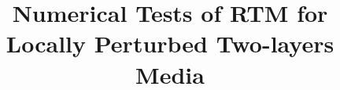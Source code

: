 \documentclass[12pt]{iopart}
\begin{document}

\def\debproof{\noindent {\bf Proof.} }
\def\finproof{\hfill {\small $\Box$} \\}
\makeatletter %
\makeatother  %
\renewcommand\theequation{{\thesection}.{\arabic{equation}}}

\title[]{Numerical Tests of RTM for Locally Perturbed Two-layers Media}
\author{ }
\address{}



\maketitle

\newcommand{\eps}{\varepsilon}
\newcommand{\RR}{\mathcal{R}}
\newtheorem{lem}{Lemma}[section]
\newtheorem{prop}{Proposition}[section]
\newtheorem{cor}{Corollary}[section]
\newtheorem{thm}{Theorem}[section]
\newtheorem{rem}{Remark}[section]
\newtheorem{alg}{Algorithm}[section]
\newtheorem{assum}{Assumption}[section]
\newtheorem{definition}{Definition}[section]


\newcommand{\MyRoman}[1]{\rm\setcounter{RomanNumber}{#1}\Roman{RomanNumber}}

\newcommand{\bL}{\mathbf{L}}
\newcommand{\bH}{\mathbf{H}}
\newcommand{\bW}{\mathbf{W}}
\newcommand{\bP}{\mathbf{P}}
\newcommand{\bQ}{\mathbf{Q}}
\newcommand{\bp}{\mathbf{p}}
\newcommand{\bq}{\mathbf{q}}
\newcommand{\uL}{u_{_{\rm L}}}
\newcommand{\vL}{v_{_{\rm L}}}
\newcommand{\tuL}{\tilde u_{_{\rm L}}}
\newcommand{\tvL}{\tilde v_{_{\rm L}}}
\newcommand{\fL}{f_{_{\rm L}}}
\newcommand{\gL}{g_{_{\rm L}}}
\newcommand{\bpL}{\bp_{_{\rm L}}}
\newcommand{\bqL}{\bq_{_{\rm L}}}
\newcommand{\tbpL}{\tilde{\bp}_{_{\rm L}}}
\newcommand{\tbqL}{\tilde{\bq}_{_{\rm L}}}
\newcommand{\tbpLf}{\tilde{\bp}_{_{\rm L,1}}}
\newcommand{\tbpLs}{\tilde{\bp}_{_{\rm L,2}}}
\newcommand{\tbqLf}{\tilde{\bq}_{_{\rm L,1}}}
\newcommand{\tbqLs}{\tilde{\bq}_{_{\rm L,2}}}
\newcommand{\bn}{\nu}
\newcommand{\bv}{\mathbf{v}}
\newcommand{\om}{\omega}
\newcommand{\pa}{\partial}
\newcommand{\la}{\langle}
\newcommand{\ra}{\rangle}
\newcommand{\lla}{\la{\hskip -2pt}\la}
\newcommand{\rra}{\ra{\hskip -2pt}\ra}
\newcommand{\jj}{\|{\hskip -0.8pt} |}
\newcommand{\al}{\alpha}
\newcommand{\ze}{\zeta}
\newcommand{\si}{\sigma}
\newcommand{\ep}{\varepsilon}
\newcommand{\na}{\nabla}
\newcommand{\vp}{\varphi}
\newcommand{\ga}{\gamma}
\newcommand{\Ga}{\Gamma}
\newcommand{\Om}{\Omega}
\newcommand{\de}{\delta}
\newcommand{\Th}{\Theta}
\newcommand{\De}{\Delta}
\newcommand{\Lam}{\Lambda}
\newcommand{\lam}{\lambda}
\newcommand{\tri}{\triangle}
\newcommand{\lj}{[{\hskip -2pt} [}
\newcommand{\rj}{]{\hskip -2pt} ]}
\newcommand{\bks}{\backslash}
\newcommand{\diam}{\mathrm{diam}}
\newcommand{\osc}{\mathrm{osc}}
\newcommand{\meas}{\mathrm{meas}}
\newcommand{\dist}{\mathrm{dist}}
\end{document}
